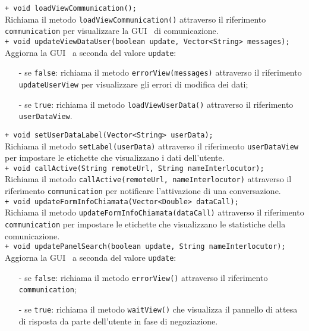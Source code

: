 {\begin{sloppypar}
{{\begin{itemize}
				\texttt{+ void loadViewCommunication();}\\
				Richiama il metodo \texttt{loadViewCommunication()} attraverso il riferimento \texttt{communication} per visualizzare la GUI\g~ di comunicazione.\\

				\texttt{+ void updateViewDataUser(boolean update, Vector<String> messages);}\\
				Aggiorna la GUI\g~ a seconda del valore \texttt{update}:
				\begin{itemize}
					\item[-] se \texttt{false}: richiama il metodo \texttt{errorView(messages)} attraverso il riferimento \texttt{updateUserView} per visualizzare gli errori di modifica dei dati;
					\item[-] se \texttt{true}: richiama il metodo \texttt{loadViewUserData()} attraverso il riferimento \texttt{userDataView}.\\
				\end{itemize}

				\texttt{+ void setUserDataLabel(Vector<String> userData);}\\
				Richiama il metodo \texttt{setLabel(userData)} attraverso il riferimento \texttt{userDataView} per impostare le etichette che visualizzano i dati dell'utente.\\

				\texttt{+ void callActive(String remoteUrl, String nameInterlocutor);}\\
				Richiama il metodo \texttt{callActive(remoteUrl, nameInterlocutor)} attraverso il riferimento \texttt{communication} per notificare l'attivazione di una conversazione.\\

				\texttt{+ void updateFormInfoChiamata(Vector<Double> dataCall);}\\
				Richiama il metodo \texttt{updateFormInfoChiamata(dataCall)} attraverso il riferimento \texttt{communication} per impostare le etichette che visualizzano le statistiche della comunicazione.\\

				\texttt{+ void updatePanelSearch(boolean update, String nameInterlocutor);}\\
				Aggiorna la GUI\g~ a seconda del valore \texttt{update}:
				\begin{itemize}
					\item[-] se \texttt{false}: richiama il metodo \texttt{errorView()} attraverso il riferimento \texttt{communication};
					\item[-] se \texttt{true}: richiama il metodo \texttt{waitView()} che visualizza il pannello di attesa di risposta da parte dell'utente in fase di negoziazione.\\
				\end{itemize}
				

\end{itemize}}}
\end{sloppypar}}

